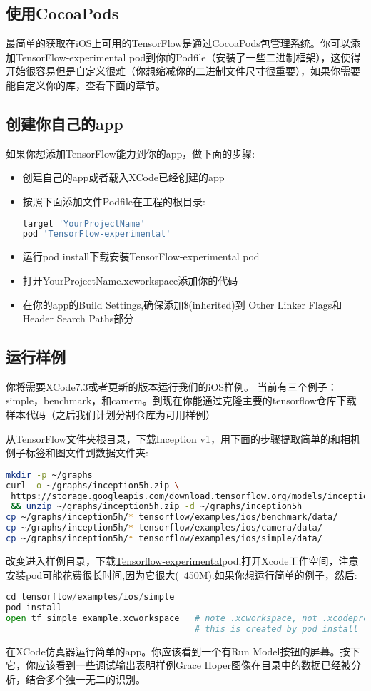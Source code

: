 \subsection{使用CocoaPods}
最简单的获取在iOS上可用的TensorFlow是通过CocoaPods包管理系统。你可以添加TensorFlow-experimental pod到你的Podfile（安装了一些二进制框架），这使得开始很容易但是自定义很难（你想缩减你的二进制文件尺寸很重要），如果你需要能自定义你的库，查看下面的章节。
\subsection{创建你自己的app}
如果你想添加TensorFlow能力到你的app，做下面的步骤:
\begin{itemize}
\item 创建自己的app或者载入XCode已经创建的app
\item 按照下面添加文件Podfile在工程的根目录:
\begin{lstlisting}[language=Bash]
target 'YourProjectName'
pod 'TensorFlow-experimental'
\end{lstlisting}
\item 运行pod install下载安装TensorFlow-experimental pod 
\item 打开YourProjectName.xcworkspace添加你的代码
\item 在你的app的Build Settings,确保添加\$(inherited)到 Other Linker Flags和Header Search Paths部分
\end{itemize}
\subsection{运行样例}
你将需要XCode7.3或者更新的版本运行我们的iOS样例。
当前有三个例子：simple，benchmark，和camera。到现在你能通过克隆主要的tensorflow仓库下载样本代码（之后我们计划分割仓库为可用样例）

从TensorFlow文件夹根目录，下载\href{https://storage.googleapis.com/download.tensorflow.org/models/inception5h.zip}{Inception v1}，用下面的步骤提取简单的和相机例子标签和图文件到数据文件夹:
\begin{lstlisting}[language=Bash]
mkdir -p ~/graphs
curl -o ~/graphs/inception5h.zip \
 https://storage.googleapis.com/download.tensorflow.org/models/inception5h.zip \
 && unzip ~/graphs/inception5h.zip -d ~/graphs/inception5h
cp ~/graphs/inception5h/* tensorflow/examples/ios/benchmark/data/
cp ~/graphs/inception5h/* tensorflow/examples/ios/camera/data/
cp ~/graphs/inception5h/* tensorflow/examples/ios/simple/data/
\end{lstlisting}
改变进入样例目录，下载\href{https://cocoapods.org/pods/TensorFlow-experimental}{Tensorflow-experimental}pod,打开Xcode工作空间，注意安装pod可能花费很长时间,因为它很大(~450M).如果你想运行简单的例子，然后:
\begin{lstlisting}[language=Python]
cd tensorflow/examples/ios/simple
pod install
open tf_simple_example.xcworkspace   # note .xcworkspace, not .xcodeproj
                                     # this is created by pod install
\end{lstlisting}
在XCode仿真器运行简单的app。你应该看到一个有Run Model按钮的屏幕。按下它，你应该看到一些调试输出表明样例Grace Hoper图像在目录中的数据已经被分析，结合多个独一无二的识别。

